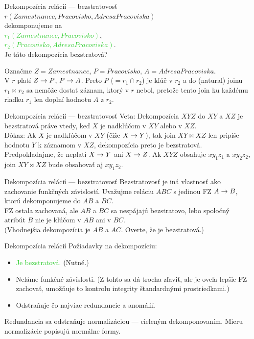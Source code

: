 \documentclass[12pt]{beamer}
\def\blue#1{\textcolor{Cerulean}{#1}}
\def\green#1{\textcolor{LimeGreen}{#1}}
\begin{document}
\begin{frame}[fragile]{Dekompozícia relácií --- bezstratovosť}
\blue{$r(Zamestnanec, Pracovisko, AdresaPracoviska)$}\\
dekomponujeme na\\
\green{$r_1(Zamestnanec, Pracovisko)$},\\
\green{$r_2(Pracovisko, AdresaPracoviska)$}.\\
Je táto dekompozícia bezstratová?
\pause

\bigskip
Označme $Z = Zamestnanec$, $P = Pracovisko$, $A = AdresaPracoviska$.\\[2mm]
V $r$ platí $Z\rightarrow P$, $P\rightarrow A$. Preto $P$ ($= r_1\cap r_2$) je kľúč v $r_2$ a do (natural) joinu $r_1\bowtie r_2$
sa nemôže dostať záznam, ktorý v $r$ nebol, pretože tento join ku každému riadku $r_1$ len doplní hodnotu $A$ z $r_2$.
\end{frame}

\begin{frame}[fragile]{Dekompozícia relácií --- bezstratovosť}
Veta: Dekompozícia $XYZ$ do $XY$ a $XZ$ je bezstratová práve vtedy, keď $X$ je nadkľúčom v $XY$ alebo v $XZ$.
\\[5mm]

Dôkaz: Ak $X$ je nadkľúčom v $XY$ (čiže $X\rightarrow Y$), tak join $XY\bowtie XZ$ len pripíše hodnotu $Y$ k záznamom v $XZ$, dekompozícia preto je bezstratová.
\\[5mm]

Predpokladajme, že neplatí $X\rightarrow Y$ ani $X\rightarrow Z$. Ak $XYZ$ obsahuje $xy_1z_1$ a $xy_2z_2$, join $XY\bowtie XZ$ bude obsahovať aj $xy_1z_2$.
\end{frame}

\begin{frame}[fragile]{Dekompozícia relácií --- bezstratovosť}
Bezstratovosť je iná vlastnosť ako zachovanie funkčných závislostí.
Uvažujme reláciu $ABC$ s jedinou FZ $A\rightarrow B$, ktorú dekomponujeme do $AB$ a $BC$.
\\[5mm]

FZ ostala zachovaná, ale $AB$ a $BC$ sa nespájajú bezstratovo, lebo spoločný atribút $B$ nie je kľúčom v $AB$ ani v $BC$.
\\[5mm]

(Vhodnejšia dekompozícia je $AB$ a $AC$. Overte, že je bezstratová.)
\end{frame}

\begin{frame}[fragile]{Dekompozícia relácií}
Požiadavky na dekompozíciu:
\begin{itemize}
\item \green{Je bezstratová.} (Nutné.)
\item \blue{Neláme funkčné závislosti.} (Z tohto sa dá trocha zľaviť,
            ale je oveľa lepšie FZ zachovať, umožňuje to kontrolu integrity štandardnými prostriedkami.)
\item \alert{Odstraňuje čo najviac redundancie a anomálií.}
\end{itemize}
Redundancia sa odstraňuje \alert{normalizáciou} --- cieleným dekomponovaním.
Mieru normalizácie popisujú \alert{normálne formy}.
\end{frame}
\end{document}
